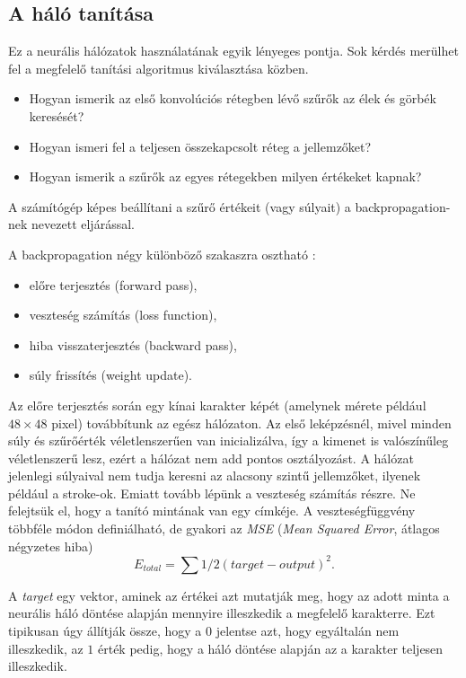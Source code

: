 \subsection{A háló tanítása}

Ez a neurális hálózatok használatának egyik lényeges pontja. Sok kérdés merülhet fel a megfelelő tanítási algoritmus kiválasztása közben.
\begin{itemize}
\item Hogyan ismerik az első konvolúciós rétegben lévő szűrők az élek és görbék keresését?
\item Hogyan ismeri fel a teljesen összekapcsolt réteg a jellemzőket?
\item Hogyan ismerik a szűrők az egyes rétegekben milyen értékeket kapnak?
\end{itemize}
A számítógép képes beállítani a szűrő értékeit (vagy súlyait) a backpropagation-nek nevezett eljárással.

A backpropagation négy különböző szakaszra osztható \cite{ABeginne32}:
\begin{itemize}
\item előre terjesztés (forward pass),
\item veszteség számítás (loss function),
\item hiba visszaterjesztés (backward pass),
\item súly frissítés (weight update).
\end{itemize}

Az előre terjesztés során egy kínai karakter képét (amelynek mérete például $48 \times 48$ pixel) továbbítunk az egész hálózaton. Az első leképzésnél, mivel minden súly és szűrőérték véletlenszerűen van inicializálva, így a kimenet is valószínűleg véletlenszerű lesz, ezért a hálózat nem add pontos osztályozást. A hálózat jelenlegi súlyaival nem tudja keresni az alacsony szintű jellemzőket, ilyenek például a stroke-ok. Emiatt tovább lépünk a veszteség számítás részre. Ne felejtsük el, hogy a tanító mintának van egy címkéje. A veszteségfüggvény többféle módon definiálható, de gyakori az \textit{MSE} (\textit{Mean Squared Error}, átlagos négyzetes hiba)
$$
E_{total} = \sum 1/2(target - output)^2.
$$ 

A \textit{target} egy vektor, aminek az értékei azt mutatják meg, hogy az adott minta a neurális háló döntése alapján mennyire illeszkedik a megfelelő karakterre. Ezt tipikusan úgy állítják össze, hogy a $0$ jelentse azt, hogy egyáltalán nem illeszkedik, az $1$ érték pedig, hogy a háló döntése alapján az a karakter teljesen illeszkedik.

